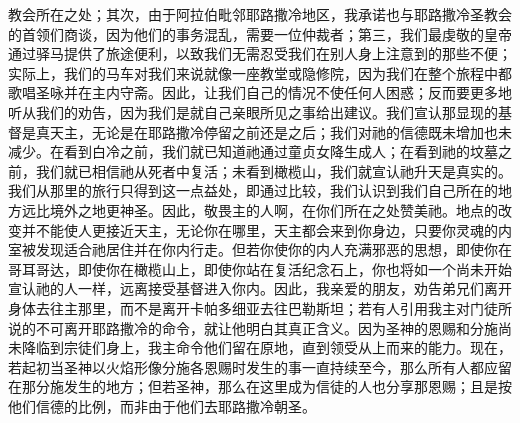 教会所在之处；其次，由于阿拉伯毗邻耶路撒冷地区，我承诺也与耶路撒冷圣教会的首领们商谈，因为他们的事务混乱，需要一位仲裁者；第三，我们最虔敬的皇帝通过驿马提供了旅途便利，以致我们无需忍受我们在别人身上注意到的那些不便；实际上，我们的马车对我们来说就像一座教堂或隐修院，因为我们在整个旅程中都歌唱圣咏并在主内守斋。因此，让我们自己的情况不使任何人困惑；反而要更多地听从我们的劝告，因为我们是就自己亲眼所见之事给出建议。我们宣认那显现的基督是真天主，无论是在耶路撒冷停留之前还是之后；我们对祂的信德既未增加也未减少。在看到白冷之前，我们就已知道祂通过童贞女降生成人；在看到祂的坟墓之前，我们就已相信祂从死者中复活；未看到橄榄山，我们就宣认祂升天是真实的。我们从那里的旅行只得到这一点益处，即通过比较，我们认识到我们自己所在的地方远比境外之地更神圣。因此，敬畏主的人啊，在你们所在之处赞美祂。地点的改变并不能使人更接近天主，无论你在哪里，天主都会来到你身边，只要你灵魂的内室被发现适合祂居住并在你内行走。但若你使你的内人充满邪恶的思想，即使你在哥耳哥达，即使你在橄榄山上，即使你站在复活纪念石上，你也将如一个尚未开始宣认祂的人一样，远离接受基督进入你内。因此，我亲爱的朋友，劝告弟兄们离开身体去往主那里，而不是离开卡帕多细亚去往巴勒斯坦；若有人引用我主对门徒所说的不可离开耶路撒冷的命令，就让他明白其真正含义。因为圣神的恩赐和分施尚未降临到宗徒们身上，我主命令他们留在原地，直到领受从上而来的能力。现在，若起初当圣神以火焰形像分施各恩赐时发生的事一直持续至今，那么所有人都应留在那分施发生的地方；但若圣神，那么在这里成为信徒的人也分享那恩赐；且是按他们信德的比例，而非由于他们去耶路撒冷朝圣。\par

